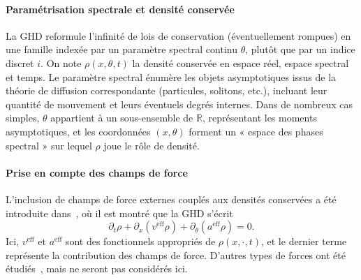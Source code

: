 \paragraph{Paramétrisation spectrale et densité conservée}  
La GHD reformule l’infinité de lois de conservation (éventuellement rompues) en une famille indexée par un paramètre spectral continu $\theta$, plutôt que par un indice discret $i$. On note $\rho(x,\theta,t)$ la densité conservée en espace réel, espace spectral et temps. Le paramètre spectral énumère les objets asymptotiques issus de la théorie de diffusion correspondante (particules, solitons, etc.), incluant leur quantité de mouvement et leurs éventuels degrés internes. Dans de nombreux cas simples, $\theta$ appartient à un sous-ensemble de $\mathbb{R}$, représentant les moments asymptotiques, et les coordonnées $(x,\theta)$ forment un « espace des phases spectral » sur lequel $\rho$ joue le rôle de densité.

\paragraph{Prise en compte des champs de force}  
L’inclusion de champs de force externes couplés aux densités conservées a été introduite dans~\cite{ref11}, où il est montré que la GHD s’écrit
\begin{equation}\label{chap:GHD:eq.GHD.1}
	\partial_t \rho + \partial_x(v^{\text{eff}} \rho) + \partial_\theta(a^{\text{eff}} \rho) = 0.
\end{equation}
Ici, $v^{\text{eff}}$ et $a^{\text{eff}}$ sont des fonctionnels appropriés de $\rho(x,\cdot,t)$, et le dernier terme représente la contribution des champs de force. D’autres types de forces ont été étudiés~\cite{Bastianello2019a,Bastianello2019b}, mais ne seront pas considérés ici.

